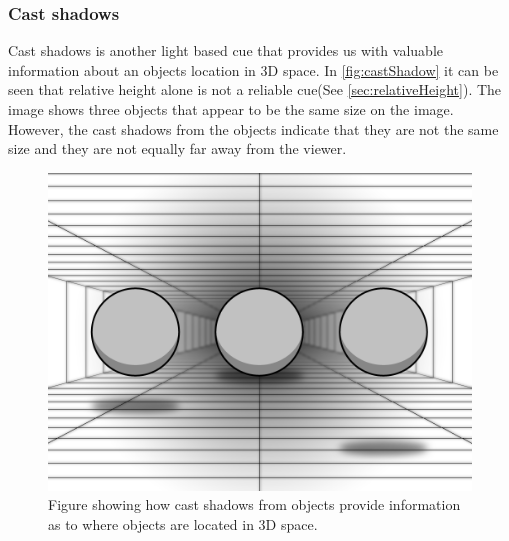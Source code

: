 \subsubsection{Cast shadows}
Cast shadows is another light based cue that provides us with valuable information about an objects location in 3D space. In \autoref{fig:castShadow} it can be seen that relative height alone is not a reliable cue(See \autoref{sec:relativeHeight}). The image shows three objects that appear to be the same size on the image. However, the cast shadows from the objects indicate that they are not the same size and they are not equally far away from the viewer\citep[p.~203]{sensationPerception}.
\begin{figure}[H]
	\centering
	\includegraphics[width=0.8\linewidth]{figure/Frontpage/frontpage2.png}
	\caption{Figure showing how cast shadows from objects provide information as to where objects are located in 3D space.}
	\label{fig:castShadow}
\end{figure}

